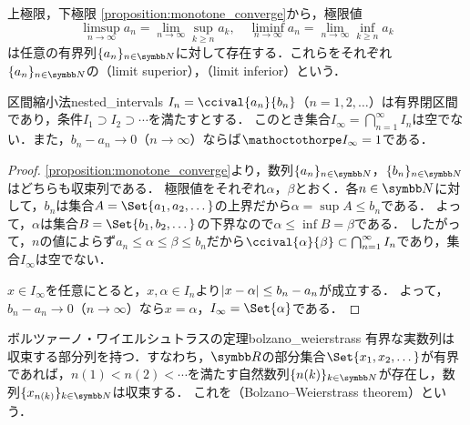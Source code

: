 \documentclass[../../main]{subfiles}
\begin{document}
\begin{definition}{上極限，下極限}{}
  \cref{proposition:monotone_converge}から，極限値
  \[
    \limsup_{n\to\infty}a_n = \lim_{n\to\infty}\sup_{k\geq n}a_k,
    \quad\liminf_{n\to\infty}a_n = \lim_{n\to\infty}\inf_{k\geq n}a_k
  \]
  は任意の有界列\(\seq{a_n}_{n\in\numset{N}}\)に対して存在する．これらをそれぞれ\(\seq{a_n}_{n\in\numset{N}}\)の（limit superior），（limit inferior）という．
\end{definition}

\begin{proposition}{区間縮小法}{nested_intervals}
  \(I_n=\ccival{a_n}{b_n}\)（\(n=1,2,\dotsc\)）は有界閉区間であり，条件\(I_1\supset I_2\supset\dotsb\)を満たすとする．
  このとき集合\(I_\infty=\bigcap_{n=1}^\infty I_n\)は空でない．また，\(b_n-a_n\to 0\)（\(n\to\infty\)）ならば\(\sizeof{I_\infty}=1\)である．
\end{proposition}

\begin{proof}
  \cref{proposition:monotone_converge}より，数列\(\seq{a_n}_{n\in\numset{N}}\)，\(\seq{b_n}_{n\in\numset{N}}\)はどちらも収束列である．
  極限値をそれぞれ\(\alpha\)，\(\beta\)とおく．各\(n\in\numset{N}\)に対して，\(b_n\)は集合\(A=\Set{a_1,a_2,\dotsc}\)の上界だから\(\alpha=\sup A\leq b_n\)である．
  よって，\(\alpha\)は集合\(B=\Set{b_1,b_2,\dotsc}\)の下界なので\(\alpha\leq\inf B=\beta\)である．
  したがって，\(n\)の値によらず\(a_n\leq\alpha\leq\beta\leq b_n\)だから\(\ccival{\alpha}{\beta}\subset\bigcap_{n=1}^\infty I_n\)であり，集合\(I_\infty\)は空でない．

  \(x\in I_\infty\)を任意にとると，\(x,\alpha\in I_n\)より\(\lvert x-\alpha\rvert\leq b_n-a_n\)が成立する．
  よって，\(b_n-a_n\to 0\)（\(n\to\infty\)）なら\(x=\alpha\)，\(I_\infty=\Set{\alpha}\)である．
\end{proof}

\begin{theorem}{ボルツァーノ・ワイエルシュトラスの定理}{bolzano_weierstrass}
  有界な実数列は収束する部分列を持つ．すなわち，\(\numset{R}\)の部分集合\(\Set{x_1,x_2,\dotsc}\)が有界であれば，\(n(1)<n(2)<\dotsb\)を満たす自然数列\(\seq{n(k)}_{k\in\numset{N}}\)が存在し，数列\(\seq{x_{n(k)}}_{k\in\numset{N}}\)は収束する．
  これを（Bolzano–Weierstrass theorem）という．
\end{theorem}
\end{document}
